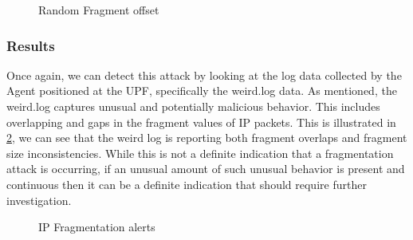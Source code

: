 \documentclass[final,1p,times,authoryear]{elsarticle}
\begin{document}
\begin{figure}[H]
  \centering
  \caption{Random Fragment offset}
  \label{fig:frag-offset}
\end{figure}

\subsubsection{Results}
\label{sub4sub2sec2}
Once again, we can detect this attack by looking at the log data collected by the Agent positioned at the UPF, specifically the weird.log data. As mentioned, the weird.log captures unusual and potentially malicious behavior. This includes overlapping and gaps in the fragment values of IP packets. This is illustrated in \ref{fig:ip-frag}, we can see that the weird log is reporting both fragment overlaps and fragment size inconsistencies. While this is not a definite indication that a fragmentation attack is occurring, if an unusual amount of such unusual behavior is present and continuous then it can be a definite indication that should require further investigation.

\begin{figure}[H]
  \centering
  \caption{IP Fragmentation alerts}
  \label{fig:ip-frag}
\end{figure}
\end{document}
